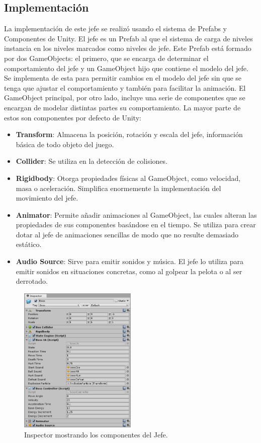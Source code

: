 \subsection{Implementación}
La implementación de este jefe se realizó usando el sistema de Prefabs y Componentes de Unity. El jefe es un Prefab al que el sistema de carga de niveles instancia en los niveles marcados como niveles de jefe. Este Prefab está formado por dos GameObjects: el primero, que se encarga de determinar el comportamiento del jefe y un GameObject hijo que contiene el modelo del jefe. Se implementa de esta para permitir cambios en el modelo del jefe sin que se tenga que ajustar el comportamiento y también para facilitar la animación. El GameObject principal, por otro lado, incluye una serie de componentes que se encargan de modelar distintas partes su comportamiento. La mayor parte de estos son componentes por defecto de Unity:
 \begin{itemize}
	\item \textbf{Transform}: Almacena la posición, rotación y escala del jefe, información básica de todo objeto del juego. 
	\item \textbf{Collider}: Se utiliza en la detección de colisiones.
	\item \textbf{Rigidbody}: Otorga propiedades físicas al GameObject, como velocidad, masa o aceleración. Simplifica enormemente la implementación del movimiento del jefe.
	\item \textbf{Animator}: Permite añadir animaciones al GameObject, las cuales alteran las propiedades de sus componentes basándose en el tiempo. Se utiliza para crear dotar al jefe de animaciones sencillas de modo que no resulte demasiado estático.
	\item \textbf{Audio Source}: Sirve para emitir sonidos y música. El jefe lo utiliza para emitir sonidos en situaciones concretas, como al golpear la pelota o al ser derrotado.
\end{itemize}

\begin{figure}[h]
	\includegraphics[width=0.5\textwidth]{images/estructura/jefe/boss-component}
	\centering
	\caption{Inspector mostrando los componentes del Jefe.}
\end{figure}


